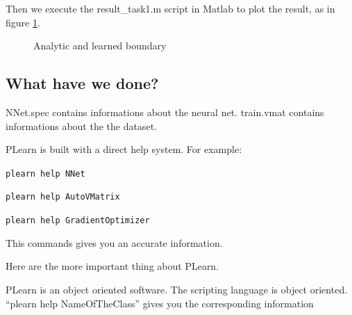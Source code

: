 Then we execute the result\_task1.m script in Matlab to plot the result, as in figure 
\ref{df}.\begin{figure}
  \caption{Analytic and learned boundary}  
\label{df}
\end{figure}

\subsection{What have we done?}

NNet.spec contains informations about the neural net. train.vmat contains informations about the the dataset.

PLearn is built with a direct help system. For example:

\texttt{plearn help NNet}

\texttt{plearn help AutoVMatrix}

\texttt{plearn help GradientOptimizer}

This commands gives you an accurate information.

Here are the more important thing about PLearn.

\begin{bf}PLearn is an object oriented software. The scripting language is object 
oriented. ``plearn help NameOfTheClass'' gives you the corresponding information
\end{bf}

